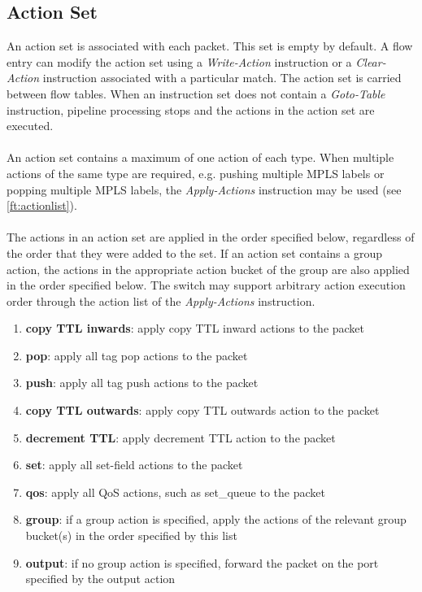 \documentclass[10pt]{article}
\begin{document}
\subsection{Action Set}
\label{ft:actionset}
An action set is associated with each packet. This set is empty by default. A flow entry can modify the action set using a \textit{Write-Action} instruction or a \textit{Clear-Action} instruction associated with a particular match. The action set is carried between flow tables. When an instruction set does not contain a \textit{Goto-Table} instruction, pipeline processing stops and the actions in the action set are executed.
\\\\
An action set contains a maximum of one action of each type. When multiple actions of the same type are required, e.g. pushing multiple MPLS labels or popping multiple MPLS labels, the \emph{Apply-Actions} instruction may be used (see \ref{ft:actionlist}).
\\\\
The actions in an action set are applied in the order specified below, regardless of the order that they were added to the set. If an action set contains a group action, the actions in the appropriate action bucket of the group are also applied in the order specified below. The switch may support arbitrary action execution order through the action list of the \textit{Apply-Actions} instruction.

\begin{enumerate}
\item \textbf{copy TTL inwards}: apply copy TTL inward actions to the packet
\item \textbf{pop}: apply all tag pop actions to the packet
\item \textbf{push}: apply all tag push actions to the packet
\item \textbf{copy TTL outwards}: apply copy TTL outwards action to the packet
\item \textbf{decrement TTL}: apply decrement TTL action to the packet
\item \textbf{set}: apply all set-field actions to the packet
\item \textbf{qos}: apply all QoS actions, such as set\_queue to the packet
\item \textbf{group}: if a group action is specified, apply the actions of the relevant group bucket(s) in the order specified by this list
\item \textbf{output}: if no group action is specified, forward the packet on the port specified by the output action
\end{enumerate}
\end{document}
